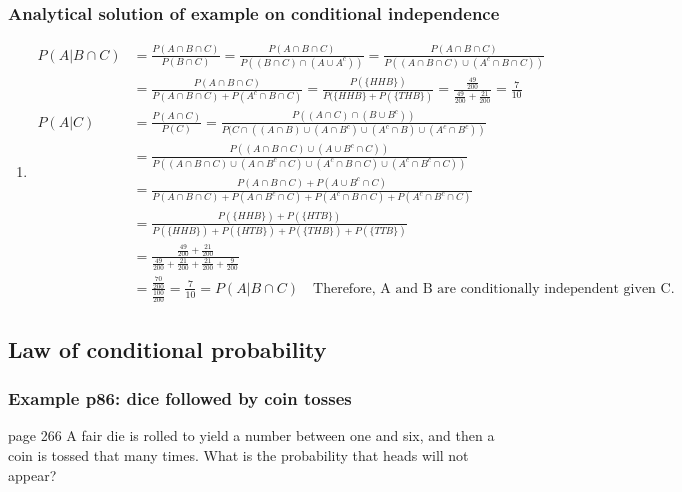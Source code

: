 \begin{frame}
    \frametitle{Analytical solution of example on conditional independence}

    \tiny
    \begin{enumerate}[a]

        \keepi
        \item
            \begin{align*}
                P(A|B\cap C)&=\frac{P(A\cap B\cap C)}{P(B\cap C)}=
                \frac{P(A\cap B\cap C)}{P((B\cap C)\cap (A\cup A^c))}=
                \frac{P(A\cap B\cap C)}{P((A\cap B\cap C)\cup (A^c\cap B\cap
                C))}\\
                &=\frac{P(A\cap B\cap C)}{P(A\cap B\cap C)+P(A^c\cap B\cap C)}=
                \frac{P(\{HHB\})}{P(\{HHB\}+P(\{THB\})}=\frac{\frac{49}{200}}{\frac{49}{200}+\frac{21}{200}}=\frac{7}{10}\\
                P(A|C)&=\frac{P(A\cap C)}{P(C)}=\frac{P((A\cap C)\cap (B\cup
                B^c))}{P(C\cap ((A\cap B)\cup (A\cap B^c)\cup (A^c\cap B)\cup
                (A^c\cap B^c))}\\
                &=\frac{P((A\cap B\cap C)\cup (A\cup B^c\cap C))}{P((A\cap
                B\cap C)\cup (A\cap B^c\cap C)\cup (A^c\cap B\cap C)\cup
                (A^c\cap B^c\cap C))}\\
                &=\frac{P(A\cap B\cap C)+P(A\cup B^c\cap C)}{P(A\cap
                B\cap C)+P(A\cap B^c\cap C)+P(A^c\cap B\cap C)+P(A^c\cap B^c\cap C)}\\
                &=\frac{P(\{HHB\})+P(\{HTB\})}{P(\{HHB\})+P(\{HTB\})+P(\{THB\})+P(\{TTB\})}\\
                &=\frac{\frac{49}{200}+\frac{21}{200}}{\frac{49}{200}+\frac{21}{200}+\frac{21}{200}+\frac{9}{200}}\\
                &=\frac{\frac{70}{200}}{\frac{100}{200}}=\frac{7}{10}=P(A|B\cap
                C)\quad\text{Therefore, A and B are conditionally independent given C.}
            \end{align*}
    \end{enumerate}
    \normalsize

\end{frame}

\subsection{Law of conditional probability}

\begin{frame}
    \frametitle{Example p86: dice followed by coin tosses}

    \begin{manualProbExample}{page 266}
        A fair die is rolled to yield a number between one and six, and then a
        coin is tossed that many times. What is the probability that heads will
        not appear?
    \end{manualProbExample}

\end{frame}

